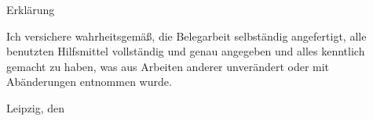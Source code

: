\thispagestyle{empty}
\begin{center}
\large \lsstyle Erklärung
\end{center}
\vspace{1.5cm}
{\doublespacing
Ich versichere wahrheitsgemäß, die Belegarbeit selbständig angefertigt, alle benutzten Hilfsmittel vollständig und genau angegeben und alles kenntlich gemacht zu haben, was aus Arbeiten anderer unverändert oder mit Abänderungen entnommen wurde.}\par
\vspace{2cm}
%
\noindent
\begin{minipage}[t]{6.5cm}
\dotfill \par
\onehalfspacing
\autor \par
Leipzig, den \datum
\end{minipage} \par
\vspace{2.5cm}
%
%
\iffalse %
%
\noindent
\begin{minipage}[t]{6.5cm}
\dotfill \par
\onehalfspacing
\autorII \par
Leipzig, den \datum
\end{minipage} \par
\vspace{2.5cm}
%
\fi %
%
\iffalse %
%
\noindent
\begin{minipage}[t]{6.5cm}
\dotfill \par
\onehalfspacing
\autorIII \par
Leipzig, den \datum
\end{minipage} \par
%
\fi  %
%
\clearpage